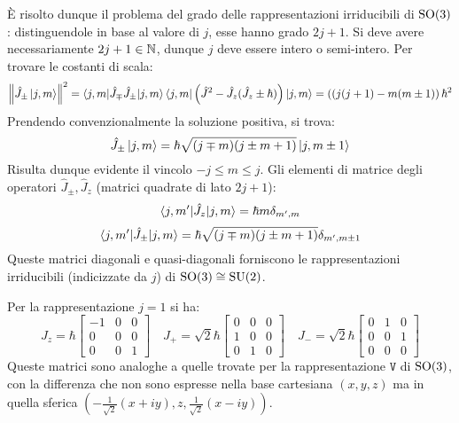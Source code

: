 È risolto dunque il problema del grado delle rappresentazioni irriducibili di $ \mathrm{SO}(3) $: distinguendole in base al valore di $ j $, esse hanno grado $ 2j + 1 $. Si deve avere necessariamente $ 2j + 1 \in \mathbb{N} $, dunque $ j $ deve essere intero o semi-intero.
Per trovare le costanti di scala:
\begin{equation*}
	\left\lVert \hat{J}_{\pm} \ket{j,m} \right\rVert^2 = \braket{j,m | \hat{J}_{\mp} \hat{J}_{\pm} | j,m} \braket{j,m | \left( \hat{J}^2 - \hat{J}_z (\hat{J}_z \pm \hbar) \right) | j,m} = \left( (j (j + 1) - m (m \pm 1) \right) \hbar^2
\end{equation*}
Prendendo convenzionalmente la soluzione positiva, si trova:
\begin{equation}
	\hat{J}_{\pm} \ket{j,m} = \hbar \sqrt{(j \mp m) (j \pm m + 1)} \ket{j, m \pm 1}
	\label{eq:9.21}
\end{equation}
Risulta dunque evidente il vincolo $ -j \le m \le j $. Gli elementi di matrice degli operatori $ \hat{J}_{\pm}, \hat{J}_z $ (matrici quadrate di lato $ 2j + 1 $):
\begin{equation}
	\braket{j,m' | \hat{J}_z | j,m} = \hbar m \delta_{m',m}
	\label{eq:9.22}
\end{equation}
\begin{equation}
	\braket{j,m' | \hat{J}_{\pm} | j,m} = \hbar \sqrt{(j \mp m) (j \pm m + 1)} \delta_{m',m \pm 1}
	\label{eq:9.23}
\end{equation}
Queste matrici diagonali e quasi-diagonali forniscono le rappresentazioni irriducibili (indicizzate da $ j $) di $ \mathrm{SO}(3) \cong \mathrm{SU}(2) $.

\begin{example}
	Per la rappresentazione $ j = 1 $ si ha:
	\begin{equation*}
		J_z = \hbar
		\begin{bmatrix}
			-1 & 0 & 0 \\
			0 & 0 & 0 \\
			0 & 0 & 1
		\end{bmatrix}
		\quad
		J_+ = \sqrt{2} \hbar
		\begin{bmatrix}
			0 & 0 & 0 \\
			1 & 0 & 0 \\
			0 & 1 & 0
		\end{bmatrix}
		\quad
		J_- = \sqrt{2} \hbar
		\begin{bmatrix}
			0 & 1 & 0 \\
			0 & 0 & 1 \\
			0 & 0 & 0
		\end{bmatrix}
	\end{equation*}
	Queste matrici sono analoghe a quelle trovate per la rappresentazione $ \mathtt{V} $ di $ \mathrm{SO}(3) $, con la differenza che non sono espresse nella base cartesiana $ (x,y,z) $ ma in quella sferica $ (-\frac{1}{\sqrt{2}}(x + iy), z, \frac{1}{\sqrt{2}} (x - iy)) $.
\end{example}

